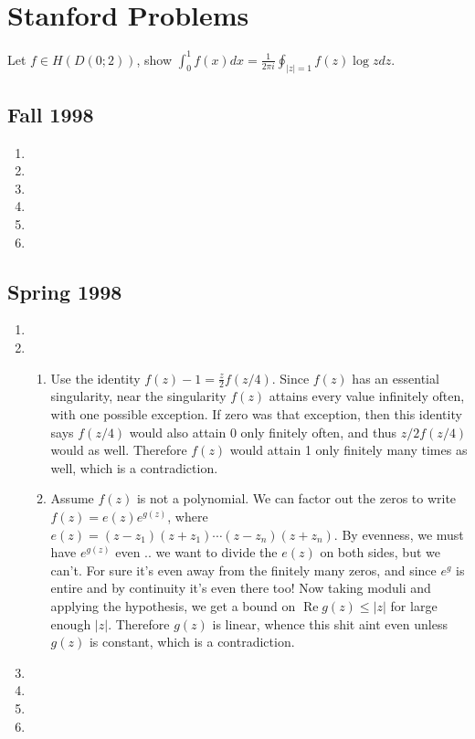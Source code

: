 \documentclass[11pt]{book}
\theoremstyle{definition}
\renewcommand{\Re}{\operatorname{Re}}
\begin{document}
\section{Stanford Problems}
Let $f\in H(D(0;2))$, show $\int_0^1 f(x)dx = \frac{1}{2\pi i}\oint _{|z|=1} f(z)\log z dz$.
\subsection{Fall 1998}
\begin{enumerate}
\item
\item
\item
\item
\item
\item
\end{enumerate}
\subsection{Spring 1998}
\begin{enumerate}
\item
\item 
\begin{enumerate}
\item Use the identity $f(z)-1=\frac{z}{2}f(z/4)$. Since $f(z)$ has an essential singularity, near the singularity $f(z)$ attains every value infinitely often, with one possible exception. If zero was that exception, then this identity says $f(z/4)$ would also attain 0 only finitely often, and thus $z/2f(z/4)$ would as well. Therefore $f(z)$ would attain 1 only finitely many times as well, which is a contradiction.
\item Assume $f(z)$ is not a polynomial. We can factor out the zeros to write $f(z)=e(z)e^{g(z)}$, where $e(z)=(z-z_1)(z+z_1)\cdots (z-z_n)(z+z_n)$. By evenness, we must have $e^{g(z)}$ even .. we want to divide the $e(z)$ on both sides, but we can't. For sure it's even away  from the finitely many zeros, and since $e^g$ is entire and by continuity it's even there too! Now taking moduli and applying the hypothesis, we get a bound on $\Re g(z) \leq |z|$ for large enough $|z|$. Therefore $g(z)$ is linear, whence this shit aint even unless $g(z)$ is constant, which is a contradiction.
\end{enumerate}
\item
\item
\item
\item
\end{enumerate}
\end{document}
